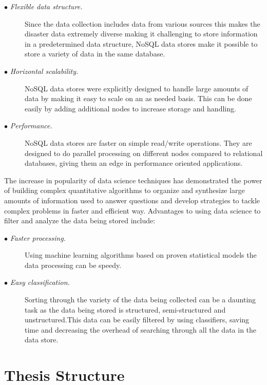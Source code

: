 \begin{description}
	
	\item[$\bullet$ \it Flexible data structure.]
	\hfill\break
	Since the data collection includes data from various sources this makes the disaster data extremely diverse making it challenging to store information in a predetermined data structure, NoSQL data stores make it possible to store a variety of data in the same database.
	
	\item[$\bullet$ \it Horizontal scalability.]
	\hfill\break
	NoSQL data stores were explicitly designed to handle large amounts of data by making it easy to scale on an as needed basis. This can be done easily by adding additional nodes to increase storage and handling.
	
	\item[$\bullet$ \it Performance.]
	\hfill\break
	NoSQL data stores are faster on simple read/write operations. They are designed to do parallel processing on different nodes compared to relational databases, giving them an edge in performance oriented applications.
\end{description}

The increase in popularity of data science techniques has demonstrated the power of building complex quantitative algorithms to organize and synthesize large amounts of information used to answer questions and develop strategies to tackle complex problems in faster and efficient way. Advantages to using data science to filter and analyze the data being stored include:

\begin{description}
	
	\item[$\bullet$ \it Faster processing.]
	\hfill\break
	Using machine learning algorithms based on proven statistical models the data processing can be speedy.
	
	\item[$\bullet$ \it Easy classification.]
	\hfill\break
	Sorting through the variety of the data being collected can be a daunting task as the data being stored is structured, semi-structured and unstructured.This data can be easily filtered by using classifiers, saving time and decreasing the overhead of searching through all the data in the data store.
\end{description}

\section{Thesis Structure}

